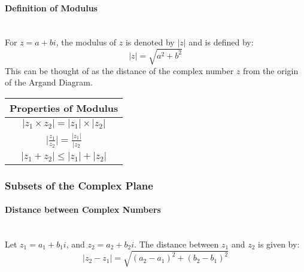 \documentclass[a4paper]{article}
\begin{document}
				\paragraph{Definition of Modulus}\mbox{}\\
					For $z=a+bi$, the modulus of $z$ is denoted by $|z|$ and is defined by:
					\[|z|=\sqrt{a^2+b^2}\]
					This can be thought of as the distance of the complex number $z$ from the origin of the Argand Diagram.\newline
					\begin{table}[h]
						\centering
						\bgroup
						\def\arraystretch{1.5}
						\begin{tabular}{|c|}
							\hline
							\textbf{Properties of Modulus} \\
							\hline
							$|z_1\times z_2|=|z_1|\times|z_2|$ \\
							\hline
							$\lvert\frac{z_1}{z_2}\rvert=\frac{|z_1|}{|z_2}$ \\
							\hline
							$|z_1+z_2|\leq|z_1|+|z_2|$ \\
							\hline
						\end{tabular}
						\egroup
					\end{table}
			\subsubsection{Subsets of the Complex Plane}
				\paragraph{Distance between Complex Numbers}\mbox{}\\
					Let $z_1=a_1+b_1i$, and $z_2=a_2+b_2i$.\newline
					The distance between $z_1$ and $z_2$ is given by: \\
					\[
						|z_2-z_1|=\sqrt{(a_2-a_1)^2+(b_2-b_1)^2}
					\]
\end{document}
